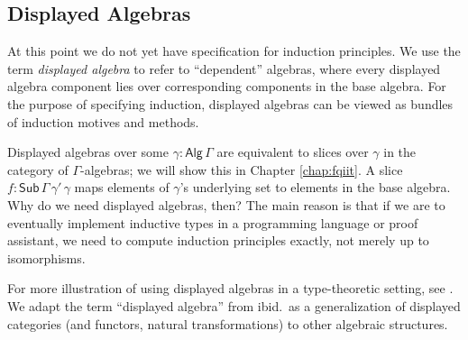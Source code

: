 \documentclass[12pt,a4paper,twoside,openany]{book}
\theoremstyle{remark}
\theoremstyle{definition}
\theoremstyle{theorem}
\newcommand{\ms}[1]{\mathsf{#1}}
\newcommand{\Sub}{\mathsf{Sub}}
\newcommand{\Alg}{\ms{Alg}}
\begin{document}
\subsection{Displayed Algebras}

At this point we do not yet have specification for induction principles. We use
the term \emph{displayed algebra} to refer to ``dependent'' algebras, where
every displayed algebra component lies over corresponding components in the base
algebra. For the purpose of specifying induction, displayed algebras can be
viewed as bundles of induction motives and methods.

Displayed algebras over some $\gamma : \Alg\,\Gamma$ are equivalent to slices
over $\gamma$ in the category of $\Gamma$-algebras; we will show this in Chapter
\ref{chap:fqiit}. A slice $f : \Sub\,\Gamma\,\gamma'\,\gamma$ maps elements of
$\gamma$'s underlying set to elements in the base algebra. Why do we need
displayed algebras, then? The main reason is that if we are to eventually
implement inductive types in a programming language or proof assistant, we need
to compute induction principles exactly, not merely up to isomorphisms.

For more illustration of using displayed algebras in a type-theoretic
setting, see \cite{displayedcats}. We adapt the term ``displayed algebra'' from
ibid.\ as a generalization of displayed categories (and functors, natural
transformations) to other algebraic structures.
\end{document}

